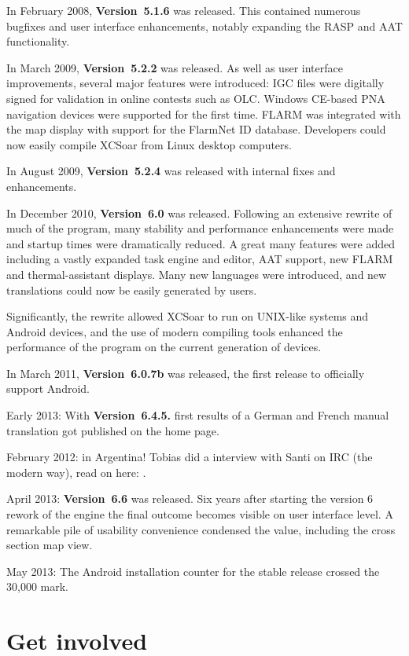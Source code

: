 In February 2008, {\bf Version~5.1.6} was released. This contained 
numerous bugfixes and user interface enhancements, notably expanding 
the RASP and AAT functionality.

In March 2009, {\bf Version~5.2.2} was released. As well as user
interface improvements, several major features were introduced:
IGC files were digitally signed for validation in online contests 
such as OLC.
Windows CE-based PNA navigation devices were supported for the
first time. 
FLARM was integrated with the map display with support for the
FlarmNet ID database.
Developers could now easily compile XCSoar from Linux desktop
computers.

In August 2009, {\bf Version~5.2.4} was released with internal
fixes and enhancements.

In December 2010, {\bf Version~6.0} was released. Following an
extensive rewrite of much of the program, many stability and
performance enhancements were made and startup times were 
dramatically reduced. A great many features were added including 
a vastly expanded task engine and editor, AAT support, new FLARM
and thermal-assistant displays. Many new languages were introduced,
and new translations could now be easily generated by users.

Significantly, the rewrite allowed XCSoar to run on UNIX-like
systems and Android devices, and the use of modern compiling 
tools enhanced the performance of the program on the current
generation of devices.

In March 2011, {\bf Version~6.0.7b} was released, the first
release to officially support Android.

Early 2013: With {\bf Version~6.4.5.} first results of a German and French manual
translation got published on the \xc home page.

February 2012:  in Argentina! Tobias did a interview
with Santi on IRC (the modern way), read on here:  
.

April 2013: {\bf Version~6.6} was released. Six years after starting the version 6 
rework of the \xc engine the final outcome becomes visible on user interface level.
A remarkable pile of usability convenience condensed the \xc value, including
the cross section map view.

May 2013: The Android \xc installation counter for the stable release crossed 
the 30,000 mark.


\section{Get involved}

